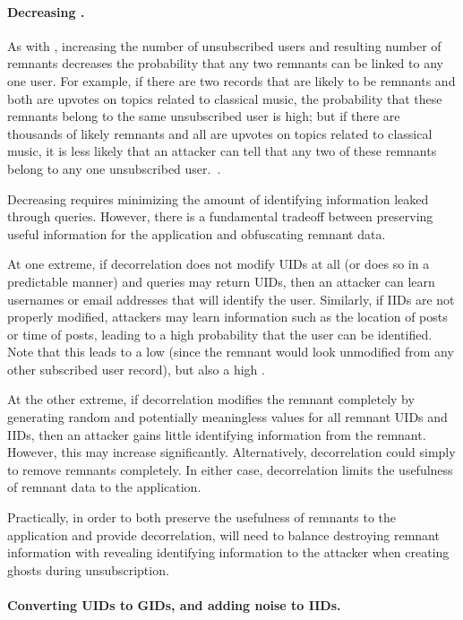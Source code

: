 \paragraph{Decreasing \plinked{}.}
As with \premnant{}, increasing the number of unsubscribed users and resulting
number of remnants decreases the probability that any two remnants can be linked to any one
user. For example, if there are two records that are likely to be remnants and both are upvotes on topics related to
classical music, the probability that these remnants belong to the same unsubscribed user is high; but if
there are thousands of likely remnants and all are upvotes on topics related to classical music, it
is less likely that an attacker can tell that any two of these remnants belong to any one
unsubscribed user.~.

Decreasing \plinked{} requires minimizing the amount of identifying information leaked
through queries. However, there is a fundamental tradeoff between preserving useful information for
the application and obfuscating remnant data. 

At one extreme, if decorrelation does not modify UIDs at all (or does so in a predictable manner)
and queries may return UIDs, then an attacker can learn usernames or email addresses that will
identify the user. Similarly, if IIDs are not properly modified, attackers may learn
information such as the location of posts or time of posts, leading to a high probability
that the user can be identified.  Note that this leads to a low \premnant{} (since the
remnant would look unmodified from any other subscribed user record), but also a high \plinked{}.

At the other extreme, if decorrelation modifies the remnant completely by generating random and
potentially meaningless values for all remnant UIDs and IIDs, then an attacker gains little identifying
information from the remnant. However, this may increase \premnant{} significantly.
Alternatively, decorrelation could simply to remove remnants completely. In either case, decorrelation limits the usefulness of remnant data to the application. 

Practically, in order to both preserve the usefulness of remnants to the application and provide
decorrelation, \sys{} will need to balance destroying remnant information with revealing identifying
information to the attacker when creating ghosts during unsubscription. 

\paragraph{Converting UIDs to GIDs, and adding noise to IIDs.}

